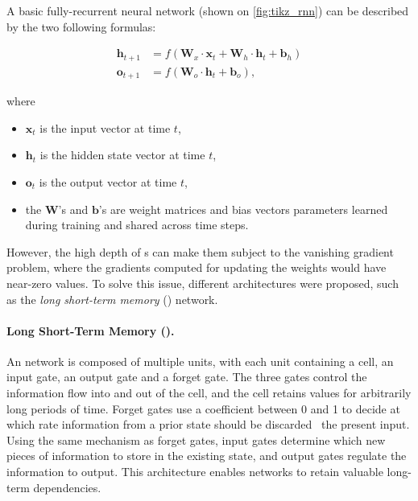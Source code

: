 A basic fully-recurrent neural network (shown on \autoref{fig:tikz_rnn}) can be described by the two following formulas:

\begin{align*}
    \mathbf{h}_{t+1} & = f\left( \mathbf{W}_x \cdot \mathbf{x}_t + \mathbf{W}_h \cdot \mathbf{h}_t + \mathbf{b}_h \right) \\
    \mathbf{o}_{t+1} & = f\left( \mathbf{W}_o \cdot \mathbf{h}_t + \mathbf{b}_o \right),
\end{align*}

where
\begin{itemize}[nolistsep]
    \item $\mathbf{x}_t$ is the input vector at time $t$,
    \item $\mathbf{h}_t$ is the hidden state vector at time $t$,
    \item $\mathbf{o}_t$ is the output vector at time $t$,
    \item the $\mathbf{W}$'s and $\mathbf{b}$'s are weight matrices and bias vectors parameters learned during training and shared across time steps.
\end{itemize}

However, the high depth of {\rnn}s can make them subject to the vanishing gradient problem, where the gradients computed for updating the weights would have near-zero values. To solve this issue, different architectures were proposed, such as the \emph{long short-term memory} (\lstm) network.

\paragraph{Long Short-Term Memory (\lstm).}
An {\lstm} network \citep{hochreiter1997long, sundermeyer2012lstm} is composed of multiple units, with each unit containing a cell, an input gate, an output gate and a forget gate. The three gates control the information flow into and out of the cell, and the cell retains values for arbitrarily long periods of time. Forget gates use a coefficient between 0 and 1 to decide at which rate information from a prior state should be discarded {\wrt}\ the present input. Using the same mechanism as forget gates, input gates determine which new pieces of information to store in the existing state, and output gates regulate the information to output. This architecture enables {\lstm} networks to  retain valuable long-term dependencies.

